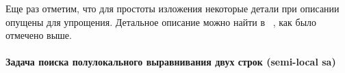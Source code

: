 

Еще раз отметим, что для простоты изложения некоторые детали при описании опущены для упрощения. Детальное описание можно найти в ~\cite{alex2007semilocal}, как было отмечено выше.




\newpage

\paragraph*{Задача поиска полулокального выравнивания двух строк (semi-local sa)}\mbox{}

